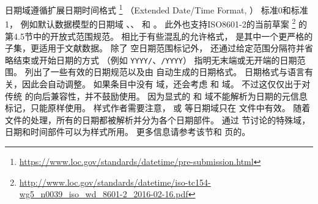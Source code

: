 
日期域遵循扩展日期时间格式%
\footnote{\url{https://www.loc.gov/standards/datetime/pre-submission.html}}
（Extended Date/Time Format, ）
标准0和标准1，
例如默认数据模型的日期域 、、 和 。
此外也支持ISO8601-2的当前草案%
\footnote{\url{http://www.loc.gov/standards/datetime/iso-tc154-wg5_n0039_iso_wd_8601-2_2016-02-16.pdf}}
的第4.5节中的开放式范围规范。
相比于有些混乱的允许格式，
 是其中一个更严格的子集，更适用于文献数据。
除了  空日期范围标记外，
还通过给定范围分隔符并省略结束或开始日期的方式
（例如 \texttt{YYYY/}、\texttt{/YYYY}）
指明无末端或无开端的日期范围。
 列出了一些有效的日期规范以及由 \biblatex 自动生成的日期格式。
日期格式与语言有关，因此会自动调整。
如果条目中没有  域，\biblatex 还会考虑  和  域。
不过这仅仅出于对传统 \BibTeX 的向后兼容性，并不鼓励使用。
因为显式的  和  域不能解析为日期的元信息标记，只能原样使用。
样式作者需要注意， 或   等日期域只在  文件中有效。
随着  文件的处理，所有的日期都被解析并分为各个日期部件。
通过  节讨论的特殊域，日期和时间部件可以为样式所用。
更多信息请参考该节和 \pageref{aut:bbx:fld:tab1} 页的。

